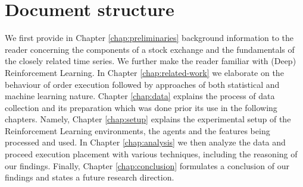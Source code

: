 \section{Document structure}

We first provide in Chapter \ref{chap:preliminaries} background information to the reader concerning the components of a stock exchange and the fundamentals of the closely related time series.
We further make the reader familiar with (Deep) Reinforcement Learning.
In Chapter \ref{chap:related-work} we elaborate on the behaviour of order execution followed by approaches of both statistical and machine learning nature.
Chapter \ref{chap:data} explains the process of data collection and its preparation which was done prior its use in the following chapters.
Namely, Chapter \ref{chap:setup} explains the experimental setup of the Reinforcement Learning environments, the agents and the features being processed and used.
In Chapter \ref{chap:analysis} we then analyze the data and proceed execution placement with various techniques, including the reasoning of our findings.
Finally, Chapter \ref{chap:conclusion} formulates a conclusion of our findings and states a future research direction.
